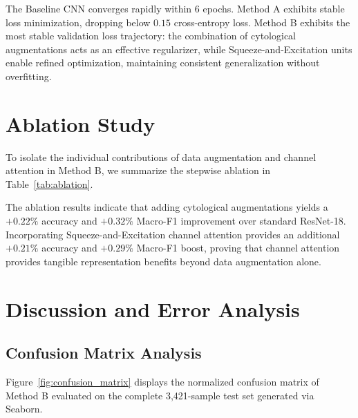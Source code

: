 \documentclass[conference]{IEEEtran}
\begin{document}
The Baseline CNN converges rapidly within 6 epochs. Method A exhibits stable loss minimization, dropping below $0.15$ cross-entropy loss. Method B exhibits the most stable validation loss trajectory: the combination of cytological augmentations acts as an effective regularizer, while Squeeze-and-Excitation units enable refined optimization, maintaining consistent generalization without overfitting.

\section{Ablation Study}
To isolate the individual contributions of data augmentation and channel attention in Method B, we summarize the stepwise ablation in Table~\ref{tab:ablation}.

\begin{table}[htbp]
\caption{Ablation Analysis of Method B Components}
\label{tab:ablation}
\centering
{}
\end{table}

The ablation results indicate that adding cytological augmentations yields a $+0.22\%$ accuracy and $+0.32\%$ Macro-F1 improvement over standard ResNet-18. Incorporating Squeeze-and-Excitation channel attention provides an additional $+0.21\%$ accuracy and $+0.29\%$ Macro-F1 boost, proving that channel attention provides tangible representation benefits beyond data augmentation alone.

\section{Discussion and Error Analysis}

\subsection{Confusion Matrix Analysis}
Figure~\ref{fig:confusion_matrix} displays the normalized confusion matrix of Method B evaluated on the complete 3,421-sample test set generated via Seaborn.
\end{document}
